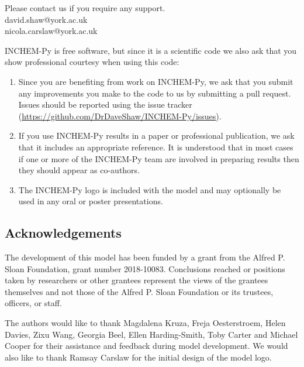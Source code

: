 \documentclass[a4paper]{refart}
\begin{document}
Please contact us if you require any support.\\
david.shaw@york.ac.uk\\
nicola.carslaw@york.ac.uk

INCHEM-Py is free software, but since it is a scientific code we also ask that you show professional courtesy when using this code:
\begin{enumerate}
    \item Since you are benefiting from work on INCHEM-Py, we ask that you submit any improvements you make to the code to us by submitting a pull request. Issues should be reported using the issue tracker (\url{https://github.com/DrDaveShaw/INCHEM-Py/issues}).
    \item If you use INCHEM-Py results in a paper or professional publication, we ask that it includes an appropriate reference. It is understood that in most cases if one or more of the INCHEM-Py team are involved in preparing results then they should appear as co-authors.
    \item The INCHEM-Py logo is included with the model and may optionally be used in any oral or poster presentations.
\end{enumerate}

\subsection{Acknowledgements}
The development of this model has been funded by a grant from the Alfred P. Sloan Foundation, grant number 2018-10083. Conclusions reached or positions taken by researchers or other grantees represent the views of the grantees themselves and not those of the Alfred P. Sloan Foundation or its trustees, officers, or staff. 

The authors would like to thank Magdalena Kruza, Freja Oesterstroem, Helen Davies, Zixu Wang, Georgia Beel, Ellen Harding-Smith, Toby Carter and Michael Cooper for their assistance and feedback during model development. We would also like to thank Ramsay Carslaw for the initial design of the model logo.


\printindex

\printbibliography

\newpage
\appendix
\end{document}
